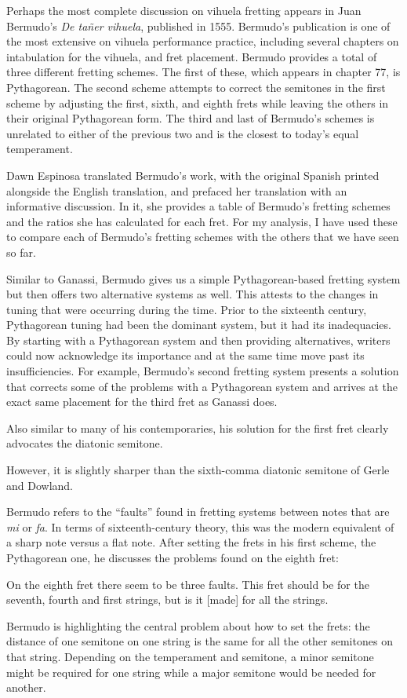 Perhaps the most complete discussion on vihuela fretting appears in Juan Bermudo's
\textit{De ta\~{n}er vihuela}, published in 1555. Bermudo's publication is one of the
most extensive on vihuela performance practice, including several chapters on
intabulation for the vihuela, and fret placement. Bermudo provides a total of three
different fretting schemes. The first of these, which appears in chapter 77, is
Pythagorean. The second scheme attempts to correct the semitones in the first scheme
by adjusting the first, sixth, and eighth frets while leaving the others in their
original Pythagorean form. The third and last of Bermudo's schemes is unrelated to
either of the previous two and is the closest to today's equal temperament.

Dawn Espinosa translated Bermudo's work, with the original Spanish printed alongside
the English translation, and prefaced her translation with an informative discussion.
In it, she provides a table of Bermudo's fretting schemes and the ratios she has
calculated for each fret. For my analysis, I have used these to compare each of
Bermudo's fretting schemes with the others that we have seen so far.

Similar to Ganassi, Bermudo gives us a simple Pythagorean-based fretting system but
then offers two alternative systems as well. This attests to the changes in
tuning that were occurring during the time. Prior to the sixteenth century, Pythagorean tuning
had been the dominant system, but it had its inadequacies. By starting with a
Pythagorean system and then providing alternatives, writers could now acknowledge its
importance and at the same time move past its insufficiencies. For example, Bermudo's second
fretting system presents a solution that corrects some of the problems with
a Pythagorean system and arrives at the exact same placement for the third fret as
Ganassi does.

Also similar to many of his contemporaries, his solution for the first fret clearly
advocates the diatonic semitone.

However, it is slightly sharper than the sixth-comma diatonic semitone of Gerle and
Dowland.

Bermudo refers to the ``faults'' found in fretting systems between notes that are
\textit{mi} or \textit{fa}. In terms of sixteenth-century theory, this was the
modern equivalent of a sharp note versus a flat note. After setting the frets in
his first scheme, the Pythagorean one, he discusses the problems found on the eighth
fret:
\begin{blocks}
On the eighth fret there seem to be three faults. This fret should be  for the
seventh, fourth and first strings, but is it [made]  for all the strings.
\autocite[95]{DE:1}
\end{blocks}
Bermudo is highlighting the central problem about how to set the frets: the distance of one
semitone on one string is the same for all the other semitones on that string. Depending
on the temperament and semitone, a minor semitone might be required for one string while
a major semitone would be needed for another.

